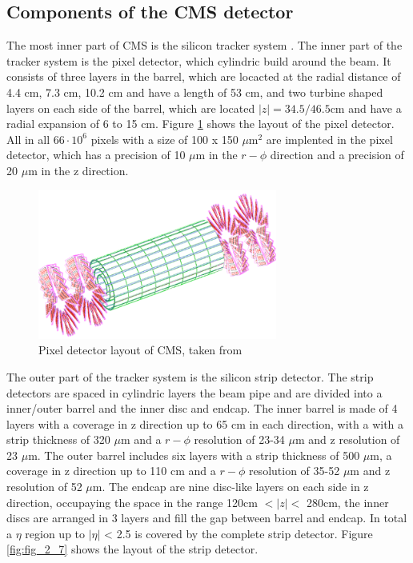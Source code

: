 \subsection{Components of the \gls{CMS} detector}
\label{sec:section_2_2_2}

The most inner part of \gls{CMS} is the silicon tracker system \cite{CMS2, CMSTRACKER}. The inner part of the tracker system is the pixel detector, which cylindric build around the beam. It consists of three layers in the barrel, which are locacted at the radial distance of 4.4 cm, 7.3 cm, 10.2 cm and have a length of 53 cm, and two turbine shaped layers on each side of the barrel, which are located $|z| = 34.5/46.5$cm and have a radial expansion of 6 to 15 cm. Figure \ref{fig:fig_2_6} shows the layout of the pixel detector. All in all $66\cdot 10^{6}$ pixels with a size of 100 x 150 $\mu$m$^{2}$ are implented in the pixel detector, which has a precision of 10 $\mu$m in the $r-\phi$ direction and a precision of 20 $\mu$m in the z direction. \\

\begin{figure}[ht]
	\centering
	\includegraphics[width=0.7\textwidth]{pictures/CMS_tracker.pdf}

	\caption[Pixel detector layout of CMS]{Pixel detector layout of CMS, taken from \cite{CMS2}}
	\label{fig:fig_2_6}
\end{figure}


The outer part of the tracker system is the silicon strip detector. The strip detectors are spaced in cylindric layers the beam pipe and are divided into a inner/outer barrel and the inner disc and endcap. The inner barrel is made of 4 layers with a coverage in z direction up to 65 cm in each direction, with a with a strip thickness of 320 $\mu$m and a $r-\phi$ resolution of 23-34 $\mu$m and z resolution of 23 $\mu$m. The outer barrel includes six layers with a strip thickness of 500 $\mu$m, a coverage in z direction up to 110 cm and a $r-\phi$ resolution of 35-52 $\mu$m and z resolution of 52 $\mu$m. The endcap are nine disc-like layers on each side in z direction, occupaying the space in the range 120cm $< |z| < $ 280cm, the inner discs are arranged in 3 layers and fill the gap between barrel and endcap. In total a $\eta$ region up to $|\eta|$ < 2.5 is covered by the complete strip detector. Figure \ref{fig:fig_2_7} shows the layout of the strip detector. \\

